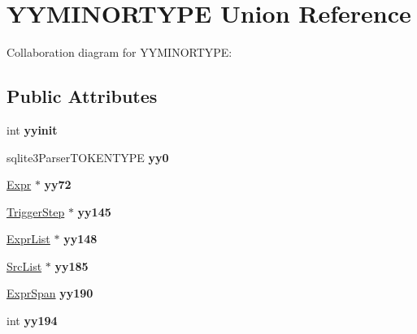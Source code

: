 \hypertarget{unionYYMINORTYPE}{}\section{Y\+Y\+M\+I\+N\+O\+R\+T\+Y\+PE Union Reference}
\label{unionYYMINORTYPE}


Collaboration diagram for Y\+Y\+M\+I\+N\+O\+R\+T\+Y\+PE\+:
\subsection*{Public Attributes}
\begin{DoxyCompactItemize}
\item 
int {\bfseries yyinit}\hypertarget{unionYYMINORTYPE_a6cec97309f473b42b70a9738d7cbd5ba}{}\label{unionYYMINORTYPE_a6cec97309f473b42b70a9738d7cbd5ba}

\item 
sqlite3\+Parser\+T\+O\+K\+E\+N\+T\+Y\+PE {\bfseries yy0}\hypertarget{unionYYMINORTYPE_a827d6a1bc7ac8df062b3f419db3f50ac}{}\label{unionYYMINORTYPE_a827d6a1bc7ac8df062b3f419db3f50ac}

\item 
\hyperlink{structExpr}{Expr} $\ast$ {\bfseries yy72}\hypertarget{unionYYMINORTYPE_a34fe9ce2985ed94777a9310c1b3fb840}{}\label{unionYYMINORTYPE_a34fe9ce2985ed94777a9310c1b3fb840}

\item 
\hyperlink{structTriggerStep}{Trigger\+Step} $\ast$ {\bfseries yy145}\hypertarget{unionYYMINORTYPE_aa628bd2fd00bcc59a06dc205b42a4d84}{}\label{unionYYMINORTYPE_aa628bd2fd00bcc59a06dc205b42a4d84}

\item 
\hyperlink{structExprList}{Expr\+List} $\ast$ {\bfseries yy148}\hypertarget{unionYYMINORTYPE_a00d83c5dca185ae3d6dc80c77b8df4d8}{}\label{unionYYMINORTYPE_a00d83c5dca185ae3d6dc80c77b8df4d8}

\item 
\hyperlink{structSrcList}{Src\+List} $\ast$ {\bfseries yy185}\hypertarget{unionYYMINORTYPE_a0d3e9aacd2a444748a63f08376ad53b6}{}\label{unionYYMINORTYPE_a0d3e9aacd2a444748a63f08376ad53b6}

\item 
\hyperlink{structExprSpan}{Expr\+Span} {\bfseries yy190}\hypertarget{unionYYMINORTYPE_a4fdf857a3eb72f0ac41c2ac99ced216e}{}\label{unionYYMINORTYPE_a4fdf857a3eb72f0ac41c2ac99ced216e}

\item 
int {\bfseries yy194}\hypertarget{unionYYMINORTYPE_a4bb7c2d6db6e99dd2825644fd32898ea}{}\label{unionYYMINORTYPE_a4bb7c2d6db6e99dd2825644fd32898ea}


\end{DoxyCompactItemize}
